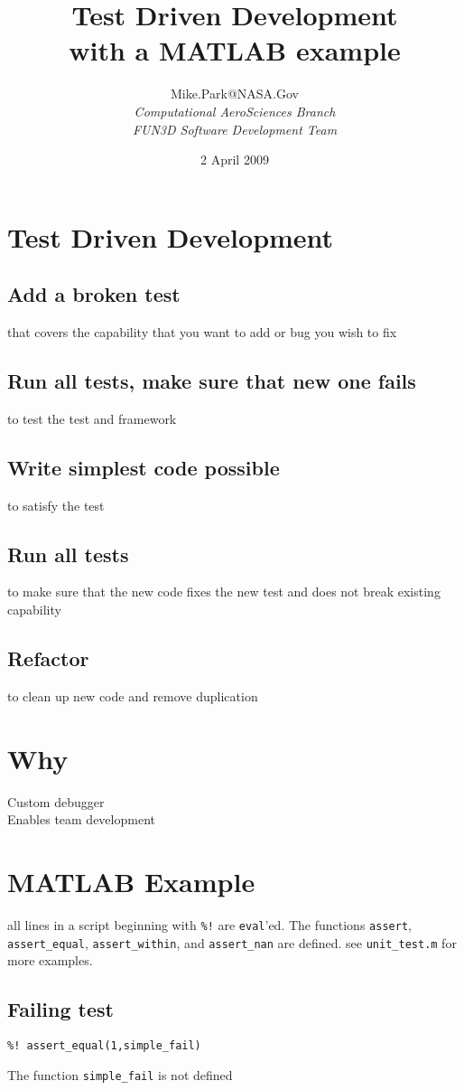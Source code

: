 \documentclass[twocolumn]{article}
\title{{\bfseries\Large Test Driven Development}\\ with a MATLAB example}
\author{
Mike.Park@NASA.Gov\\
	 {\itshape Computational AeroSciences Branch} \\
	 {\itshape FUN3D Software Development Team}
}
\date{2 April 2009}
\begin{document}
  
  \maketitle

  \section{Test Driven Development}
  \subsection{Add a broken test}
  that covers the capability that you want to add or bug you wish to fix
  \subsection{Run all tests, make sure that new one fails}
  to test the test and framework
  \subsection{Write simplest code possible}
  to satisfy the test
  \subsection{Run all tests}
  to make sure that the new code fixes the new test and does not break
  existing capability
  \subsection{Refactor}
  to clean up new code and remove duplication

  \section{Why}

  Custom debugger\\
  Enables team development

  \section{MATLAB Example}
  all lines in a script beginning with \texttt{\%!} are \texttt{eval}'ed. 
  The functions \texttt{assert}, \texttt{assert\_equal}, 
  \texttt{assert\_within}, and \texttt{assert\_nan} are defined.
  see \texttt{unit\_test.m} for more examples.
  \subsection{Failing test}
  \begin{verbatim}
%! assert_equal(1,simple_fail)
  \end{verbatim}
  The function \texttt{simple\_fail} is not defined 
\end{document}
